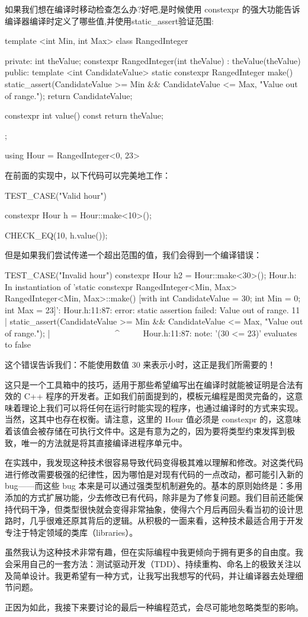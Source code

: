 如果我们想在编译时移动检查怎么办?好吧,是时候使用 constexpr 的强大功能告诉编译器编译时定义了哪些值,并使用static\_assert验证范围:

\begin{cpp}
template <int Min, int Max>
class RangedInteger{
private:
  int theValue;
  constexpr RangedInteger(int theValue) : theValue(theValue) {}
public:
  template <int CandidateValue>
  static constexpr RangedInteger make() {
    static_assert(CandidateValue >= Min && CandidateValue <= Max, "Value out of range.");
    return CandidateValue;
  }

  constexpr int value() const {
    return theValue;
  }
};

using Hour = RangedInteger<0, 23>
\end{cpp}

在前面的实现中，以下代码可以完美地工作：

\begin{cpp}
TEST_CASE("Valid hour"){
  constexpr Hour h = Hour::make<10>();

  CHECK_EQ(10, h.value());
}
\end{cpp}

但是如果我们尝试传递一个超出范围的值，我们会得到一个编译错误：

\begin{shell}
TEST_CASE("Invalid hour"){
  constexpr Hour h2 = Hour::make<30>();
}
Hour.h: In instantiation of 'static constexpr RangedInteger<Min, Max>
RangedInteger<Min, Max>::make() [with int CandidateValue = 30; int Min
= 0; int Max = 23]':
Hour.h:11:87: error: static assertion failed: Value out of range.
   11 | static_assert(CandidateValue >= Min && CandidateValue <= Max, "Value out of range.");
      |                                        ~~~~~~~~~~~~~~~^~~~~~
Hour.h:11:87: note: '(30 <= 23)' evaluates to false
\end{shell}

这个错误告诉我们：不能使用数值 30 来表示小时，这正是我们所需要的！

这只是一个工具箱中的技巧，适用于那些希望编写出在编译时就能被证明是合法有效的 C++ 程序的开发者。正如我们前面提到的，模板元编程是图灵完备的，这意味着理论上我们可以将任何在运行时能实现的程序，也通过编译时的方式来实现。当然，这其中也存在权衡。请注意，这里的 Hour 值必须是 constexpr 的，这意味着该值会被存储在可执行文件中。这是有意为之的，因为要将类型约束发挥到极致，唯一的方法就是将其直接编译进程序单元中。

在实践中，我发现这种技术很容易导致代码变得极其难以理解和修改。对这类代码进行修改需要极强的纪律性，因为哪怕是对现有代码的一点改动，都可能引入新的 bug——而这些 bug 本来是可以通过强类型机制避免的。基本的原则始终是：多用添加的方式扩展功能，少去修改已有代码，除非是为了修复问题。我们目前还能保持代码干净，但类型很快就会变得非常抽象，使得六个月后再回头看当初的设计思路时，几乎很难还原其背后的逻辑。从积极的一面来看，这种技术最适合用于开发专注于特定领域的类库（libraries）。

虽然我认为这种技术非常有趣，但在实际编程中我更倾向于拥有更多的自由度。我会采用自己的一套方法：测试驱动开发（TDD）、持续重构、命名上的极致关注以及简单设计。我更希望有一种方式，让我写出我想写的代码，并让编译器去处理细节问题。

正因为如此，我接下来要讨论的最后一种编程范式，会尽可能地忽略类型的影响。